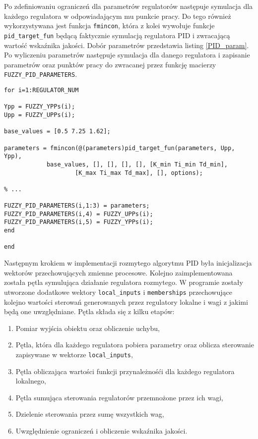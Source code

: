 Po zdefiniowaniu ograniczeń dla parametrów regulatorów następuje symulacja dla każdego regulatora w odpowiadającym mu punkcie pracy. Do tego również wykorzystywana jest funkcja \verb+fmincon+, która z kolei wywołuje funkcje \verb+pid_target_fun+ będącą faktycznie symulacją regulatora PID i zwracającą wartość wskaźnika jakości. Dobór parametrów przedstawia listing \ref{PID_param}. Po wyliczeniu parametrów następuje symulacja dla danego regulatora i zapisanie parametrów oraz punktów pracy do zwracanej przez funkcję macierzy \verb+FUZZY_PID_PARAMETERS+. 
\\

\begin{lstlisting}[style=custommatlab,frame=single,label={PID_param},caption={Funkcja dobierająca parametry regulatorów lokalnych},captionpos=b]
for i=1:REGULATOR_NUM

Ypp = FUZZY_YPPs(i);
Upp = FUZZY_UPPs(i);

base_values = [0.5 7.25 1.62];

parameters = fmincon(@(parameters)pid_target_fun(parameters, Upp, Ypp), 
			base_values, [], [], [], [], [K_min Ti_min Td_min], 
					[K_max Ti_max Td_max], [], options);

% ...

FUZZY_PID_PARAMETERS(i,1:3) = parameters;
FUZZY_PID_PARAMETERS(i,4) = FUZZY_UPPs(i);
FUZZY_PID_PARAMETERS(i,5) = FUZZY_YPPs(i);
end

end
\end{lstlisting}

Następnym krokiem w implementacji rozmytego algorytmu PID była inicjalizacja wektorów przechowujących zmienne procesowe. Kolejno zaimplementowana została pętla symulująca działanie regulatora rozmytego. W programie zostały utworzone dodatkowe wektory \verb+local_inputs+ i \verb+memberships+ przechowujące kolejno wartości sterowań generowanych przez regulatory lokalne i wagi z jakimi będą one uwzględniane. Pętla składa się z kilku etapów:
\begin{enumerate}
\item Pomiar wyjścia obiektu oraz obliczenie uchybu,
\item Pętla, która dla każdego regulatora pobiera parametry oraz oblicza sterowanie zapisywane w wektorze \verb+local_inputs+,
\item Pętla obliczająca wartości funkcji przynależnośći dla każdego regulatora lokalnego,
\item Pętla sumująca sterowania regulatorów przemnożone przez ich wagi,
\item Dzielenie sterowania przez sumę wszystkich wag,
\item Uwzględnienie ograniczeń i obliczenie wskaźnika jakości.
\end{enumerate}

